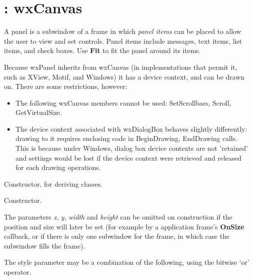 \section{: wxCanvas}\label{wxpanel}

A panel is a subwindow of a frame in which {\it panel items} can be placed to allow
the user to view and set controls. Panel items include messages, text items, list items,
and check boxes. Use {\bf Fit} to fit the panel around its items.

Because wxPanel inherits from wxCanvas (in implementations that permit it,
such as XView, Motif, and Windows) it has a device context, and can be drawn
on. There are some restrictions, however:

\begin{itemize}\itemsep=0pt
\item The following wxCanvas members cannot be used: SetScrollbars, Scroll, GetVirtualSize.
\item The device context associated with wxDialogBox behaves slightly
differently: drawing to it requires enclosing code in BeginDrawing, EndDrawing
calls. This is because under Windows, dialog box device contexts are not 'retained'
and settings would be lost if the device context were retrieved and released
for each drawing operations.
\end{itemize}

\label{constrpanel}


Constructor, for deriving classes.


Constructor.

The parameters {\it x}, {\it y}, {\it width} and {\it height} can be
omitted on construction if the position and size will later be set (for
example by a application frame's {\bf OnSize} callback, or if there is
only one subwindow for the frame, in which case the subwindow fills the
frame).

The style parameter may be a combination of the following, using the bitwise `or' operator.

\begin{twocollist}\itemsep=0pt
\end{twocollist}

